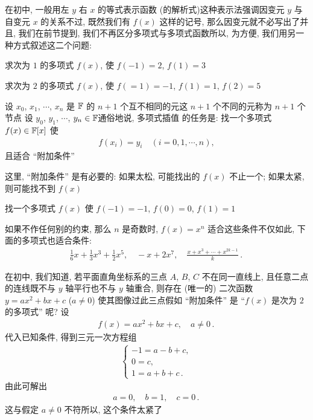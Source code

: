 在初中, 一般用左 $y$ 右 $x$ 的等式表示函数 (的解析式)\period 这种表示法强调因变元  $y$ 与自变元  $x$ 的关系\period 不过, 既然我们有 $f(x)$ 这样的记号, 那么因变元就不必写出了\period 并且, 我们在前节提到, 我们不再区分多项式与多项式函数\period 所以, 为方便, 我们用另一种方式叙述这二个问题:

\begin{example}
    求次为 $1$ 的多项式 $f(x)$, 使 $f(-1)=2$, $f(1)=3$\period
\end{example}

\begin{example}
    求次为 $2$ 的多项式 $f(x)$, 使 $f(=1)=-1$, $f(1)=1$, $f(2)=5$\period
\end{example}

设 $x_0$, $x_1$, $\cdots$, $x_{n}$ 是 $\mathbb{F}$ 的 $n+1$ 个互不相同的元\period 这 $n+1$ 个不同的元称为 $n+1$ 个节点  设 $y_0$, $y_1$, $\cdots$, $y_{n} \in \mathbb{F}$\period 通俗地说, 多项式插值  的任务是: 找一个多项式 $f(x) \in \mathbb{F}[x]$ 使
\begin{align*}
    f(x_i) = y_i \quad (i = 0,1,\cdots,n),
\end{align*}
且适合 ``附加条件''\period

这里, ``附加条件'' 是有必要的: 如果太松, 可能找出的 $f(x)$ 不止一个; 如果太紧, 则可能找不到 $f(x)$\period

\begin{example}
    找一个多项式 $f(x)$ 使 $f(-1)=-1$, $f(0)=0$, $f(1)=1$\period

    如果不作任何别的约束, 那么 $n$ 是奇数时, $f(x) = x^n$ 适合这些条件\period 不仅如此, 下面的多项式也适合条件:
    \begin{align*}
        \frac{1}{6}x + \frac{1}{3}x^3 + \frac{1}{2}x^5, \quad -x + 2x^7, \quad \frac{x + x^3 + \cdots + x^{2k-1}}{k} \period
    \end{align*}

    在初中, 我们知道, 若平面直角坐标系的三点 $A$, $B$, $C$ 不在同一直线上, 且任意二点的连线既不与 $y$ 轴平行也不与 $y$ 轴重合, 则存在 (唯一的) 二次函数 $y = ax^2 + bx + c$ ($a \neq 0$) 使其图像过此三点\period 假如 ``附加条件'' 是 ``$f(x)$ 是次为 $2$ 的多项式'' 呢? 设
    \begin{align*}
        f(x) = ax^2 + bx + c, \quad a \neq 0 \period
    \end{align*}
    代入已知条件, 得到三元一次方程组
    \begin{align*}
        \begin{cases}
            -1 = a - b + c, \\
            0 = c,          \\
            1 = a + b + c \period
        \end{cases}
    \end{align*}
    由此可解出
    \begin{align*}
        a = 0, \quad b = 1, \quad c = 0 \period
    \end{align*}
    这与假定 $a \neq 0$ 不符\period 所以, 这个条件太紧了\period
\end{example}


